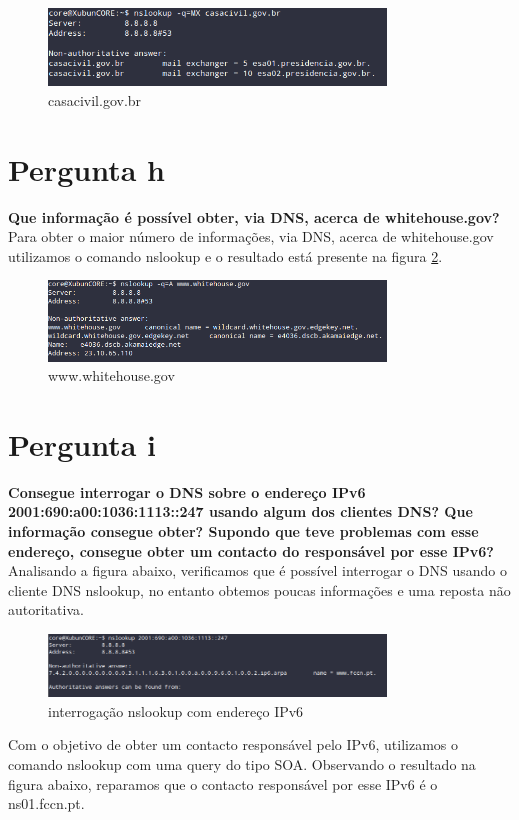 \documentclass[a4paper]{report}
\begin{document}
\begin{figure}[H]
    \centering 
    \includegraphics[width=0.8\textwidth]{images/casacivil_gov_br.png}  
    \caption{casacivil.gov.br}
    \label{fig:casacivil.gov.br}
\end{figure}

\section{Pergunta h}
\textbf{Que informação é possível obter, via DNS, acerca de whitehouse.gov?}\\
Para obter o maior número de informações, via DNS, acerca de whitehouse.gov
utilizamos o comando nslookup e o resultado está presente na figura 
\ref{fig:www.whitehouse.gov}.

\begin{figure}[H]
    \centering 
    \includegraphics[width=0.8\textwidth]{images/withehouse_gov.png}  
    \caption{www.whitehouse.gov}
    \label{fig:www.whitehouse.gov}
\end{figure}

\section{Pergunta i}
\textbf{Consegue interrogar o DNS sobre o endereço IPv6
2001:690:a00:1036:1113::247 usando algum dos clientes DNS? Que informação
consegue obter? Supondo que teve problemas com esse endereço, consegue obter um
contacto do responsável por esse IPv6?}\\
Analisando a figura abaixo, verificamos que é possível interrogar o DNS usando o
cliente DNS nslookup, no entanto obtemos poucas informações e uma reposta não
autoritativa.

\begin{figure}[H]
    \centering 
    \includegraphics[width=0.8\textwidth]{images/nslookup_ipv6.png}  
    \caption{interrogação nslookup com endereço IPv6}
    \label{fig:nslookup_ipv6}
\end{figure}
Com o objetivo de obter um contacto responsável pelo IPv6, utilizamos
o comando nslookup com uma query do tipo SOA. Observando o resultado
na figura abaixo, reparamos que o contacto responsável por esse IPv6 
é o ns01.fccn.pt.
\end{document}
